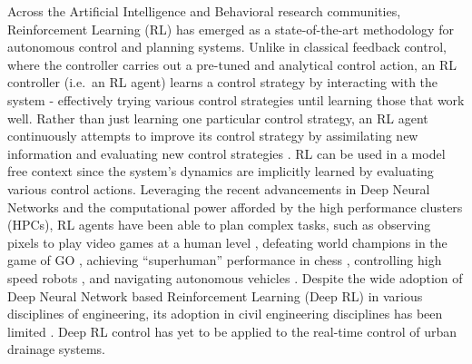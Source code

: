 Across the Artificial Intelligence and Behavioral research communities, Reinforcement Learning (RL) has emerged as a state-of-the-art methodology for autonomous control and planning systems.
Unlike in classical feedback control, where the controller carries out a pre-tuned and analytical control action, an RL controller (i.e.\ an RL agent) learns a control strategy by interacting with the system - effectively trying various control strategies until learning those that work well.
Rather than just learning one particular control strategy, an RL agent continuously attempts to improve its control strategy by assimilating new information and evaluating new control strategies \cite{Sutton98}.
RL can be used in a model free context since the system’s dynamics are implicitly learned by evaluating various control actions.
Leveraging the recent advancements in Deep Neural Networks and the computational power afforded by the high performance clusters (HPCs), RL agents have been able to plan complex tasks, such as observing pixels to play video games at a human level \cite{Mnih2015}, defeating world champions in the game of GO \cite{silver2017masteringgo}, achieving “superhuman” performance in chess \cite{Silver2017MasteringAlgorithm}, controlling high speed robots \cite{Kober2013ReinforcementSurvey}, and navigating autonomous vehicles \cite{Ng2006AutonomousLearning}.
Despite the wide adoption of Deep Neural Network based Reinforcement Learning (Deep RL) in various disciplines of engineering, its adoption in civil engineering disciplines has been limited \cite{abdulhai2003reinforcement,bhattacharya2003neural, castelletti2010tree}.
Deep RL control has yet to be applied to the real-time control of urban drainage systems.

\

